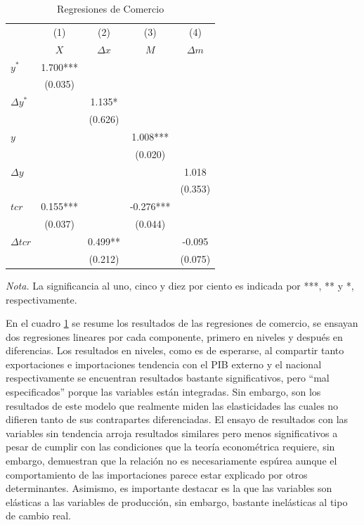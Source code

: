 \documentclass[12pt,letterpaper]{article}
\begin{document}
\begin{table}
\caption[Table caption text]{Regresiones de Comercio}
\begin{center}
\begin{threeparttable}
\begin{tabular}{lcccc}									
\hline									
\hline	
	&	(1)	&	(2)	&	(3)	&	(4)	\\
	&	$X$	&	$\Delta x$	& $M$	&	$\Delta m$	\\
\hline	
$y^*$	&	1.700***	&		&		&		\\
	&	(0.035)	&		&		&		\\
$\Delta y^*$	&		&	1.135*	&		&		\\
	&		&	(0.626)	&		&		\\
$y$	&		&		&	1.008***	&		\\
	&		&		&	(0.020)	&		\\
$\Delta y$	&		&		&		&	1.018	\\
	&		&		&		&	(0.353)	\\
$tcr$	&	0.155***	&	&	-0.276***	&	\\
	&	(0.037)	&	&	(0.044)	&	\\
$\Delta tcr$	&	&	0.499**	&	&	-0.095	\\
	&	&	(0.212)	&	&	(0.075)	\\
\hline									
\hline									
\end{tabular}	
\begin{tablenotes}
\small
 \item  \emph{Nota.} La significancia al uno, cinco y diez por ciento es indicada por ***, ** y *, respectivamente.
\end{tablenotes}								
\end{threeparttable}					
\end{center}
\label{Rec}	
\end{table}	

En el cuadro \ref{Rec} se resume los resultados de las regresiones de comercio, se ensayan dos regresiones lineares por cada componente, primero en niveles y después en diferencias. Los resultados en niveles, como es de esperarse, al compartir tanto exportaciones e importaciones tendencia con el PIB externo y el nacional respectivamente se encuentran resultados bastante significativos, pero ``mal especificados'' porque las variables están integradas. Sin embargo, son los resultados de este modelo que realmente miden las elasticidades las cuales no difieren tanto de sus contrapartes diferenciadas. El ensayo de resultados con las variables sin tendencia arroja resultados similares pero menos significativos a pesar de cumplir con las condiciones que la teoría econométrica requiere, sin embargo, demuestran que la relación no es necesariamente espúrea aunque el comportamiento de las importaciones parece estar explicado por otros determinantes. Asimismo, es importante destacar es la que las variables son elásticas a las variables de producción, sin embargo, bastante inelásticas al tipo de cambio real.
\end{document}
